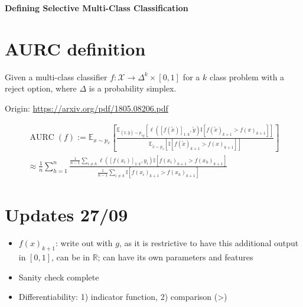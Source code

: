 \begin{center}{\noindent\Large\bf Defining Selective Multi-Class Classification}\end{center}

\section{AURC definition}

Given a multi-class classifier $f: \mathcal{X} \rightarrow \Delta^{k} \times [0,1]$ for a $k$ class problem with a reject option, where $\Delta$ is a probability simplex. %

\noindent Origin: \url{https://arxiv.org/pdf/1805.08206.pdf}

\begin{align}
    \operatorname{AURC}(f) := \mathbb{E}_{x \sim p_x} \left[  \frac{\mathbb{E}_{(\tilde{x},\tilde{y})\sim p_{xy}}[\ell([f(\tilde{x})]_{1:k},\tilde{y}) \mathbb{I}[f(\tilde{x})_{k+1} > f(x)_{k+1}]]}{\mathbb{E}_{\tilde{x}\sim p_{x}}[ \mathbb{I}[f(\tilde{x})_{k+1} > f(x)_{k+1}]]} \right] \\
    \approx \frac{1}{n} \sum_{h=1}^n \frac{\frac{1}{n-1} \sum_{i\neq h} \ell([f(x_i)]_{1:k},y_i) \mathbb{I}[f(x_i)_{k+1} > f(x_h)_{k+1}]}{\frac{1}{n-1} \sum_{i\neq h} \mathbb{I}[f(x_i)_{k+1} > f(x_h)_{k+1}]}
\end{align}

\section*{Updates 27/09}

\begin{itemize} %
    \item $f(x)_{k+1}$: write out with $g$, as it is restrictive to have this additional output in $[0,1]$, can be in $\mathbb{R}$; can have its own parameters and features
    \item Sanity check complete
    \item Differentiability: 1) indicator function, 2) comparison (>)
\end{itemize}


